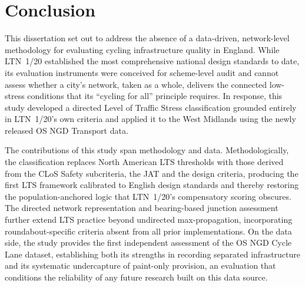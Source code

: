 \chapter{Conclusion}
\label{ch:conclusion}

This dissertation set out to address the absence of a data-driven, network-level methodology for evaluating cycling infrastructure quality in England. While LTN~1/20 established the most comprehensive national design standards to date, its evaluation instruments were conceived for scheme-level audit and cannot assess whether a city's network, taken as a whole, delivers the connected low-stress conditions that its ``cycling for all'' principle requires. In response, this study developed a directed Level of Traffic Stress classification grounded entirely in LTN~1/20's own criteria and applied it to the West Midlands using the newly released OS NGD Transport data.

The contributions of this study span methodology and data. Methodologically, the classification replaces North American LTS thresholds with those derived from the CLoS Safety subcriteria, the JAT and the design criteria, producing the first LTS framework calibrated to English design standards and thereby restoring the population-anchored logic that LTN~1/20's compensatory scoring obscures. The directed network representation and bearing-based junction assessment further extend LTS practice beyond undirected max-propagation, incorporating roundabout-specific criteria absent from all prior implementations. On the data side, the study provides the first independent assessment of the OS NGD Cycle Lane dataset, establishing both its strengths in recording separated infrastructure and its systematic undercapture of paint-only provision, an evaluation that conditions the reliability of any future research built on this data source.

